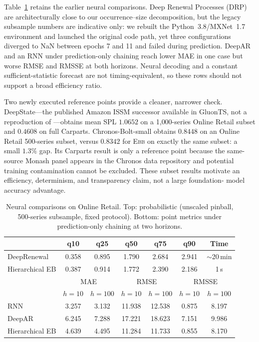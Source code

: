 \documentclass[twocolumn,10pt]{article}
\theoremstyle{definition}
\newcommand{\EBB}{\textsc{Ebb}}
\begin{document}
Table~\ref{tab:neural} retains the earlier neural comparisons. Deep
Renewal Processes (DRP) \citep{turkmen2019} are architecturally close to
our occurrence--size decomposition, but the legacy subsample numbers are
indicative only: we rebuilt the Python~3.8/MXNet~1.7 environment and
launched the original code path, yet three configurations diverged to
NaN between epochs 7 and 11 and failed during prediction. DeepAR and an
RNN under prediction-only chaining reach lower MAE in one case but worse
RMSE and RMSSE at both horizons. Neural decoding and a constant
sufficient-statistic forecast are not timing-equivalent, so these rows
should not support a broad efficiency ratio.

Two newly executed reference points provide a cleaner, narrower check.
DeepState---the published Amazon ISSM successor available in GluonTS,
not a reproduction of \citet{seeger2016}---obtains mean SPL $1.0652$ on
a 1{,}000-series Online Retail subset and $0.4608$ on full Carparts.
Chronos-Bolt-small obtains $0.8448$ on an Online Retail 500-series subset,
versus $0.8342$ for \EBB{} on exactly the same subset: a small $1.3\%$
gap. Its Carparts result is only a reference point because the same-source
Monash panel appears in the Chronos data repository and potential training
contamination cannot be excluded. These subset results motivate an
efficiency, determinism, and transparency claim, not a large foundation-
model accuracy advantage.

\begin{table}[t]
\centering
\caption{Neural comparisons on Online Retail. Top: probabilistic
(unscaled pinball, 500-series subsample, fixed protocol). Bottom: point
metrics under prediction-only chaining at two horizons.}
\label{tab:neural}
\small
\setlength{\tabcolsep}{4pt}
\begin{tabular}{lcccccc}
\toprule
 & q10 & q25 & q50 & q75 & q90 & Time\\
\midrule
DeepRenewal & 0.358 & 0.895 & 1.790 & 2.684 & 2.941 & $\sim$20\,min\\
Hierarchical EB & 0.387 & 0.914 & 1.772 & 2.390 & 2.186 & 1\,s\\
\midrule
 & \multicolumn{2}{c}{MAE} & \multicolumn{2}{c}{RMSE} & \multicolumn{2}{c}{RMSSE}\\
 & $h{=}10$ & $h{=}100$ & $h{=}10$ & $h{=}100$ & $h{=}10$ & $h{=}100$\\
\midrule
RNN & 3.257 & 3.132 & 11.938 & 12.538 & 0.875 & 8.197\\
DeepAR & 6.245 & 7.288 & 17.221 & 18.623 & 7.151 & 9.986\\
Hierarchical EB & 4.639 & 4.495 & 11.284 & 11.733 & 0.855 & 8.170\\
\bottomrule
\end{tabular}
\end{table}
\end{document}
